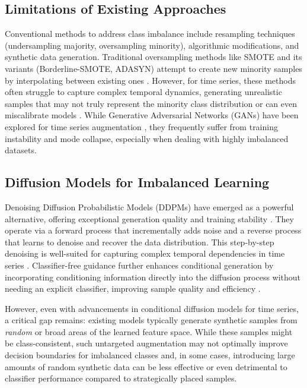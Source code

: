 \documentclass{article}
\begin{document}
\subsection{Limitations of Existing Approaches}
Conventional methods to address class imbalance include resampling techniques (undersampling majority, oversampling minority), algorithmic modifications, and synthetic data generation. Traditional oversampling methods like SMOTE and its variants (Borderline-SMOTE, ADASYN) attempt to create new minority samples by interpolating between existing ones \cite{Chawla_2002,10.1007/11538059_91, 4633969}. However, for time series, these methods often struggle to capture complex temporal dynamics, generating unrealistic samples that may not truly represent the minority class distribution or can even miscalibrate models \cite{carriero2024harmsclassimbalancecorrections}. While Generative Adversarial Networks (GANs) have been explored for time series augmentation \cite{li2022tts}, they frequently suffer from training instability and mode collapse, especially when dealing with highly imbalanced datasets.

\subsection{Diffusion Models for Imbalanced Learning}
Denoising Diffusion Probabilistic Models (DDPMs) have emerged as a powerful alternative, offering exceptional generation quality and training stability \cite{Ho_2020_DDPM, Sohl_Dickstein_2015_Diffusion}. They operate via a forward process that incrementally adds noise and a reverse process that learns to denoise and recover the data distribution. This step-by-step denoising is well-suited for capturing complex temporal dependencies in time series \cite{rasul2021autoregressive, li2024biodiffusion}. Classifier-free guidance further enhances conditional generation by incorporating conditioning information directly into the diffusion process without needing an explicit classifier, improving sample quality and efficiency \cite{Ho_Salimans_2022_ClassifierFree}.

However, even with advancements in conditional diffusion models for time series, a critical gap remains: existing models typically generate synthetic samples from \textit{random} or broad areas of the learned feature space. While these samples might be class-consistent, such untargeted augmentation may not optimally improve decision boundaries for imbalanced classes and, in some cases, introducing large amounts of random synthetic data can be less effective or even detrimental to classifier performance compared to strategically placed samples.
\end{document}
